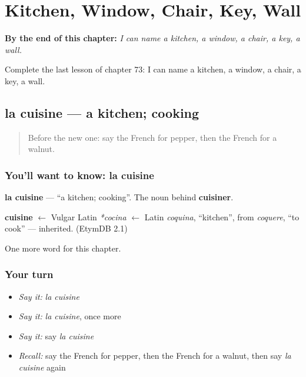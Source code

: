 
\chapter{Kitchen, Window, Chair, Key, Wall}
\label{ch:fr-kitchen-window-chair-key-wall}

\begin{chapteropening}
\textbf{By the end of this chapter:} \emph{I can name a kitchen, a window, a chair, a key, a wall.}

Complete the last lesson of chapter 73: I can name a kitchen, a window, a chair, a key, a wall.
\end{chapteropening}

\section[la cuisine]{la cuisine — a kitchen; cooking}

\label{lesson:FR-C73-cuisine}



\begin{quote}
Before the new one: say the French for pepper, then the French for a walnut.
\end{quote}

\subsection*{You'll want to know: la cuisine}
\textbf{la cuisine} — \textquotedblleft{}a kitchen; cooking\textquotedblright{}. The noun behind \textbf{cuisiner}.

\begin{cousinweb}
\textbf{cuisine} $\leftarrow$ Vulgar Latin \emph{*cocina} $\leftarrow$ Latin \emph{coquina}, \textquotedblleft{}kitchen\textquotedblright{}, from \emph{coquere}, \textquotedblleft{}to cook\textquotedblright{} — inherited. (EtymDB 2.1)
\end{cousinweb}

\begin{grammarlens}[title={What you've built}]
One more word for this chapter.
\end{grammarlens}

\subsection*{Your turn}
\begin{itemize}
\raggedright
  \item \emph{Say it:} \emph{la cuisine}
  \item \emph{Say it:} \emph{la cuisine}, once more
  \item \emph{Say it:} say \emph{la cuisine}
  \item \emph{Recall:} say the French for pepper, then the French for a walnut, then say \emph{la cuisine} again
\end{itemize}

